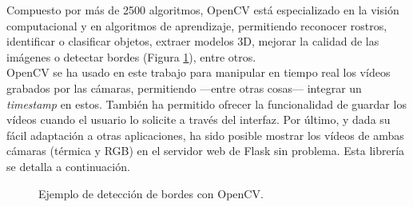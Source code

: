 Compuesto por más de 2500 algoritmos, OpenCV está especializado en la visión computacional y en algoritmos de aprendizaje, permitiendo reconocer rostros, identificar o clasificar objetos, extraer modelos 3D, mejorar la calidad de las imágenes o detectar bordes (Figura \ref{fig:ej-opencv}), entre otros.\\

OpenCV se ha usado en este trabajo para manipular en tiempo real los vídeos grabados por las cámaras, permitiendo ---entre otras cosas--- integrar un \textit{timestamp} en estos. También ha permitido ofrecer la funcionalidad de guardar los vídeos cuando el usuario lo solicite a través del interfaz. Por último, y dada su fácil adaptación a otras aplicaciones, ha sido posible mostrar los vídeos de ambas cámaras (térmica y RGB) en el servidor web de Flask sin problema. Esta librería se detalla a continuación.\\
\begin{figure}[h!]
  \begin{center}
    \hspace{9mm}
    \hspace{9mm}
    \hspace{9mm}
  \end{center}
\caption{Ejemplo de detección de bordes con OpenCV.} \label{fig:ej-opencv}
\end{figure}

